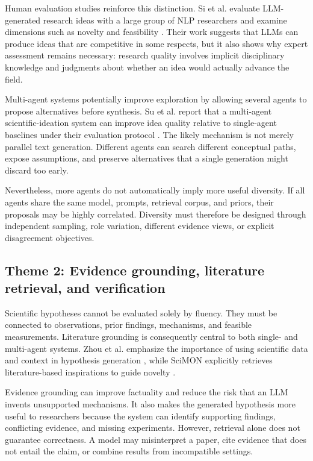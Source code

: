 \documentclass[11pt]{article}
\begin{document}
Human evaluation studies reinforce this distinction. Si et al. evaluate LLM-generated research ideas
with a large group of NLP researchers and examine dimensions such as novelty and feasibility
\cite{si2025novel}. Their work suggests that LLMs can produce ideas that are competitive in some
respects, but it also shows why expert assessment remains necessary: research quality involves
implicit disciplinary knowledge and judgments about whether an idea would actually advance the
field.

Multi-agent systems potentially improve exploration by allowing several agents to propose
alternatives before synthesis. Su et al. report that a multi-agent scientific-ideation system can
improve idea quality relative to single-agent baselines under their evaluation protocol
\cite{su2025many}. The likely mechanism is not merely parallel text generation. Different agents
can search different conceptual paths, expose assumptions, and preserve alternatives that a single
generation might discard too early.

Nevertheless, more agents do not automatically imply more useful diversity. If all agents share the
same model, prompts, retrieval corpus, and priors, their proposals may be highly correlated.
Diversity must therefore be designed through independent sampling, role variation, different
evidence views, or explicit disagreement objectives.

\subsection{Theme 2: Evidence grounding, literature retrieval, and verification}
\label{subsec:evidence-grounding}

Scientific hypotheses cannot be evaluated solely by fluency. They must be connected to
observations, prior findings, mechanisms, and feasible measurements. Literature grounding is
consequently central to both single- and multi-agent systems. Zhou et al. emphasize the importance
of using scientific data and context in hypothesis generation \cite{zhou2024hypothesis}, while
SciMON explicitly retrieves literature-based inspirations to guide novelty \cite{wang2024scimon}.

Evidence grounding can improve factuality and reduce the risk that an LLM invents unsupported
mechanisms. It also makes the generated hypothesis more useful to researchers because the system
can identify supporting findings, conflicting evidence, and missing experiments. However, retrieval
alone does not guarantee correctness. A model may misinterpret a paper, cite evidence that does not
entail the claim, or combine results from incompatible settings.
\end{document}
